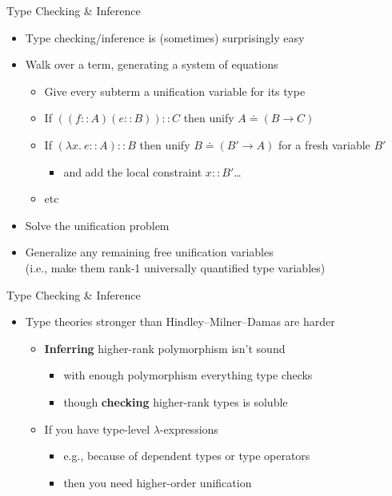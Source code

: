 \documentclass[pdf,fyma2]{prosper} %
\renewcommand{\emph}[1]{\textbf{#1}}
\begin{document}
\begin{slide}{Type Checking \& Inference}
	\vspace{1em}
	\begin{itemize}
	\item Type checking/inference is (sometimes) surprisingly easy
	\item Walk over a term, generating a system of equations
        \begin{itemize}
        \item Give every subterm a unification variable for its type
        \item If $((f :: A) (e :: B)) :: C$ then unify $A \doteq (B \to C)$
        \item If $(\lambda x.~ e :: A) :: B$ then unify $B \doteq (B' \to A)$ for a fresh variable $B'$
            \begin{itemize}
            \item and add the local constraint $x :: B'$\ldots
            \end{itemize}
        \item etc
        \end{itemize}
    \item Solve the unification problem
    \item Generalize any remaining free unification variables
        \\ (i.e., make them rank-1 universally quantified type variables)
	\end{itemize}
\end{slide}

\begin{slide}{Type Checking \& Inference}
	\vspace{1em}
	\begin{itemize}
	\item Type theories stronger than Hindley--Milner--Damas are harder
	\vspace{1em}
        \begin{itemize}
        \item \emph{Inferring} higher-rank polymorphism isn't sound
            \begin{itemize}
            \item with enough polymorphism everything type checks
            \item though \emph{checking} higher-rank types is soluble
            \end{itemize}
	\vspace{1em}
        \item If you have type-level $\lambda$-expressions
            \begin{itemize}
            \item e.g., because of dependent types or type operators
            \item then you need higher-order unification
            \end{itemize}
        \end{itemize}
	\end{itemize}
\end{slide}
\end{document}
